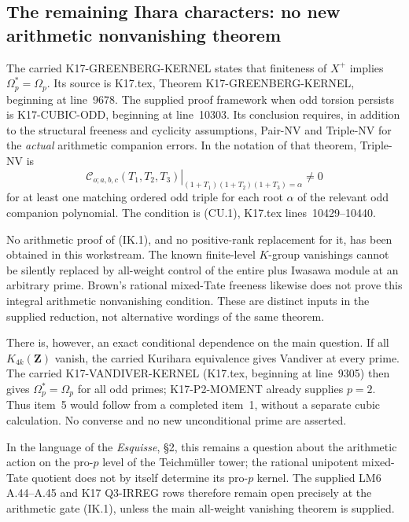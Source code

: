 \documentclass[11pt,a4paper]{article}
\theoremstyle{definition}
\begin{document}


\subsection{The remaining Ihara characters: no new arithmetic
nonvanishing theorem}
\label{sec:kt-ihara-gate}

The carried K17-GREENBERG-KERNEL states that finiteness of
$X^+$ implies $\Omega_p^*=\Omega_p$. Its source is
K17.tex, Theorem K17-GREENBERG-KERNEL, beginning at
line~9678. The supplied proof framework when odd torsion
persists is K17-CUBIC-ODD, beginning at line~10303.
Its conclusion requires, in addition to the structural
freeness and cyclicity assumptions, Pair-NV and Triple-NV
for the \emph{actual} arithmetic companion errors.
In the notation of that theorem, Triple-NV is
\[
 \left.
 \mathcal C_{o;a,b,c}(T_1,T_2,T_3)
 \right|_{(1+T_1)(1+T_2)(1+T_3)=\alpha}\ne0
                                                               \tag{IK.1}
\]
for at least one matching ordered odd triple for each root
$\alpha$ of the relevant odd companion polynomial.
The condition is (CU.1), K17.tex lines~10429--10440.

No arithmetic proof of (IK.1), and no positive-rank
replacement for it, has been obtained in this workstream.
The known finite-level $K$-group vanishings cannot be
silently replaced by all-weight control of the entire
plus Iwasawa module at an arbitrary prime. Brown's rational
mixed-Tate freeness likewise does not prove this integral
arithmetic nonvanishing condition. These are distinct
inputs in the supplied reduction, not alternative wordings
of the same theorem.

There is, however, an exact conditional dependence on the
main question. If all $K_{4k}(\mathbf Z)$ vanish, the carried
Kurihara equivalence gives Vandiver at every prime. The
carried K17-VANDIVER-KERNEL (K17.tex, beginning at line~9305)
then gives $\Omega_p^*=\Omega_p$ for all odd primes; K17-P2-MOMENT
already supplies $p=2$. Thus item~5 would follow from a
completed item~1, without a separate cubic calculation.
No converse and no new unconditional prime are asserted.

In the language of the \emph{Esquisse}, \S2, this remains
a question about the arithmetic action on the pro-$p$
level of the Teichm\"uller tower; the rational unipotent
mixed-Tate quotient does not by itself determine its
pro-$p$ kernel. The supplied LM6 A.44--A.45 and K17
Q3-IRREG rows therefore remain open precisely at the
arithmetic gate (IK.1), unless the main all-weight
vanishing theorem is supplied.


\end{document}
